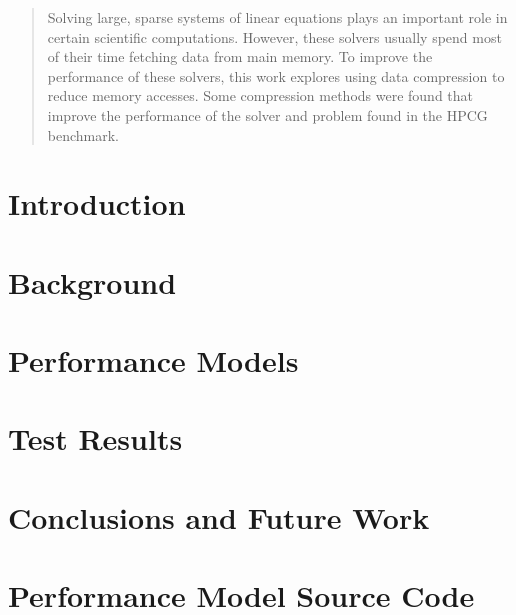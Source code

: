 \documentclass[]{article}
\begin{document}
\clearpage

\vspace*{\fill}
\begin{abstract}
	Solving large, sparse systems of linear equations plays an important role in certain scientific computations.
	However, these solvers usually spend most of their time fetching data from main memory.
	To improve the performance of these solvers, this work explores using data compression to reduce memory accesses.
	Some compression methods were found that improve the performance of the solver and problem found in the HPCG benchmark.
\end{abstract}
\vspace*{\fill}

\clearpage

\tableofcontents

\clearpage

\section{Introduction}


\section{Background}


\section{Performance Models}


\section{Test Results}


\section{Conclusions and Future Work}





\appendix

\section{Performance Model Source Code}
\label{app:decode-model-source}

 
\end{document}
